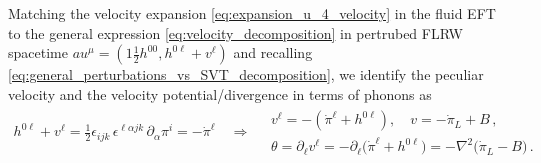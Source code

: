 Matching the velocity expansion \eqref{eq:expansion_u_4_velocity} in the fluid EFT to the general expression \eqref{eq:velocity_decomposition} in pertrubed FLRW spacetime $au^\mu =(1\tfrac12 h^{00},h^{0\ell}+ v^\ell)$ and recalling \eqref{eq:general_perturbations_vs_SVT_decomposition}, we identify the peculiar velocity and the velocity potential/divergence in terms of phonons as
{\small
\begin{align}\label{eq:peculiar_velocity_fluid_vs_phonons}
    h^{0\ell}+v^\ell = \frac{1}{2}\epsilon_{i j k}\,\epsilon^{\ell \alpha j k}\,\partial_\alpha\pi^i = -\dot{\pi}^\ell\quad \Rightarrow \quad \begin{array}{c} v^\ell=-(\dot{\pi}^\ell+h^{0\ell}),\quad v = -\dot{\pi}_L+B\,,\\[2.5pt]
        \theta=\partial_\ell v^\ell=-\partial_\ell\big(\dot{\pi}^\ell+h^{0\ell}\big)= -\nabla^2\big(\dot{\pi}_L-B\big)\,.\end{array}
\end{align}}

